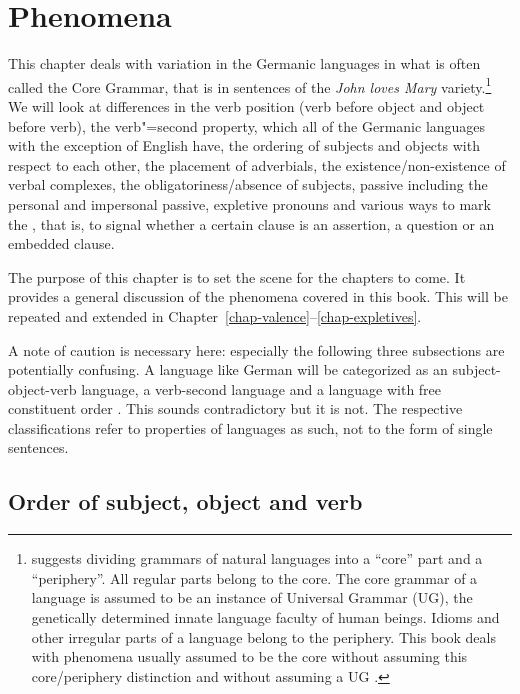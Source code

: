 
\settowidth{}


\chapter{Phenomena}

This chapter deals with variation in the Germanic languages in what is often called the Core
Grammar, that is in sentences of the \emph{John loves Mary} variety.\footnote{%
  \citet[--8]{Chomsky81a} suggests dividing grammars of natural languages into a ``core'' part and a ``periphery''.
All regular parts belong to the core. The core grammar of a language is assumed to be an instance of
Universal Grammar (UG), the genetically determined innate language faculty of human beings. Idioms
and other irregular parts of a language belong to the periphery. This book deals with phenomena
usually assumed to be the core without assuming this core/periphery distinction and without assuming
a UG \citep{MuellerKernigkeit,MuellerCoreGram}.
} We will look at differences in
the verb position (verb before object and object before verb), the verb"=second property, which
all of the Germanic languages with the exception of English have, the ordering of subjects and
objects with respect to each other, the placement of adverbials, the existence/non-existence of
verbal complexes, the obligatoriness/absence of subjects, passive including the personal and
impersonal passive, expletive pronouns and various ways to mark the , that is, to
signal whether a certain clause is an assertion, a question or an embedded clause.

The purpose of this chapter is to set the scene for the chapters to come. It provides a general
discussion of the phenomena covered in this book. This will be repeated and extended in Chapter~\ref{chap-valence}--\ref{chap-expletives}.

A note of caution is necessary here: especially the following three subsections are potentially
confusing. A language like German will be categorized as an subject-object-verb language, a verb-second language and
a language with free constituent order \citep{Haftka96a}. This sounds contradictory but it is not. The respective
classifications refer to properties of languages as such, not to the form of single sentences.

\section{Order of subject, object and verb}
\label{sec-intro-svo}

